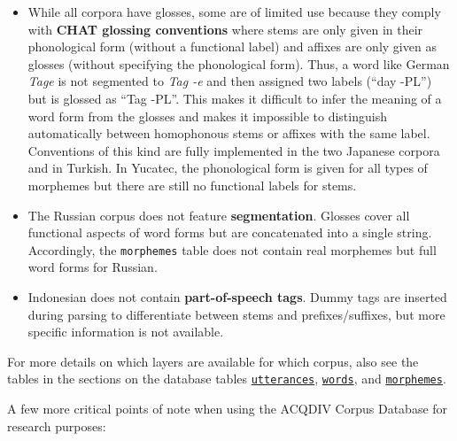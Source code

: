 \documentclass[a4paper, 11pt]{book}
\begin{document}
\begin{itemize}
	\item While all corpora have glosses, some are of limited use because they comply with \textbf{CHAT glossing conventions} where stems are only given
		in their phonological form (without a functional label) and affixes are only given as glosses (without specifying the phonological form). 
		Thus, a word like German \emph{Tage} is not segmented to \emph{Tag -e} and then assigned two labels (“day -PL”) but is glossed as “Tag -PL”. 
		This makes it difficult to infer the meaning of a word form from the glosses and makes it impossible to distinguish automatically between 
		homophonous stems or affixes with the same label. Conventions of this kind are fully implemented in the two Japanese corpora and in Turkish. 
		In Yucatec, the phonological form is given for all types of morphemes but there are still no functional labels for stems. 
	\item The Russian corpus does not feature \textbf{segmentation}. Glosses cover all functional aspects of word forms but are concatenated into a
		single string. Accordingly, the \texttt{morphemes} table does not contain real morphemes but full word forms for Russian. 	 
	\item Indonesian does not contain \textbf{part-of-speech tags}. Dummy tags are inserted during parsing to differentiate between stems and prefixes/suffixes, 
		but more specific information is not available. 
\end{itemize}

For more details on which layers are available for which corpus, also see the tables in the sections on the database tables \hyperref[subsec:Table utterances]{\texttt{utterances}}, \hyperref[subsec:Table words]{\texttt{words}}, and \hyperref[subsec:Table morphemes]{\texttt{morphemes}}. 

A few more critical points of note when using the ACQDIV Corpus Database for research purposes:
\end{document}

